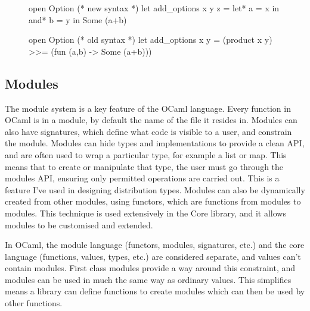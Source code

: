 \begin{figure}[!htb]
	\centering
	\begin{minipage}{0.45\textwidth}
		\centering
		\begin{ocamlcode-in}
			open Option
			(* new syntax *)
			let add_options x y z = 
			  let* a = x in
			  and* b = y in
			  Some (a+b)
		\end{ocamlcode-in}
	\end{minipage}
	\begin{minipage}{0.45\textwidth}
		\centering
		\begin{ocamlcode-in}
			open Option
			(* old syntax *)
			let add_options x y = 
			  (product x y)
			    >>= (fun (a,b) -> 
			      Some (a+b)))
		\end{ocamlcode-in}
	\end{minipage}
\end{figure}
	
\subsection{Modules}
The module system is a key feature of the OCaml language. Every function in OCaml is in a module, by default the name of the file it resides in. Modules can also have signatures, which define what code is visible to a user, and constrain the module. Modules can hide types and implementations to provide a clean API, and are often used to wrap a particular type, for example a list or map. This means that to create or manipulate that type, the user must go through the modules API, ensuring only permitted operations are carried out. This is a feature I've used in designing distribution types. Modules can also be dynamically created from other modules, using functors, which are functions from modules to modules. This technique is used extensively in the Core library, and it allows modules to be customised and extended.
	
In OCaml, the module language (functors, modules, signatures, etc.) and the core language (functions, values, types, etc.) are considered separate, and values can't contain modules. First class modules provide a way around this constraint, and modules can be used in much the same way as ordinary values. This simplifies means a library can define functions to create modules which can then be used by other functions.
	
